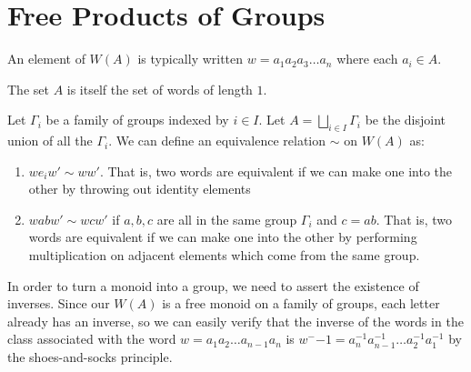 \classheader{}

\section*{Free Products of Groups}



An element of $W(A)$ is typically written $w=a_1a_2a_3\dots a_n$ where each $a_i\in A$.


The set $A$ is itself the set of words of length $1$.

Let $\Gamma_i$ be a family of groups indexed by $i\in I$.  Let $A=\bigsqcup\limits_{i\in I}\Gamma_i$ be the disjoint union of all the $\Gamma_i$.  We can define an equivalence relation $\sim$ on $W(A)$ as:

\begin{enumerate}
	
	\item[] $we_iw' \sim ww'$.  That is, two words are equivalent if we can make one into the other by throwing out identity elements
	\item[] $wabw' \sim wcw'$ if $a,b,c$ are all in the same group $\Gamma_i$ and $c=ab$.  That is, two words are equivalent if we can make one into the other by performing multiplication on adjacent elements which come from the same group.
	
\end{enumerate}


	
	
In order to turn a monoid into a group, we need to assert the existence of inverses.  Since our $W(A)$ is a free monoid on a family of groups, each letter already has an inverse, so we can easily verify that the inverse of the words in the class associated with the word $w=a_1a_2\dots a_{n-1}a_n$ is $w^-{-1}=a_n^{-1}a_{n-1}^{-1}\dots a_{2}^{-1}a_1^{-1}$ by the shoes-and-socks principle.

